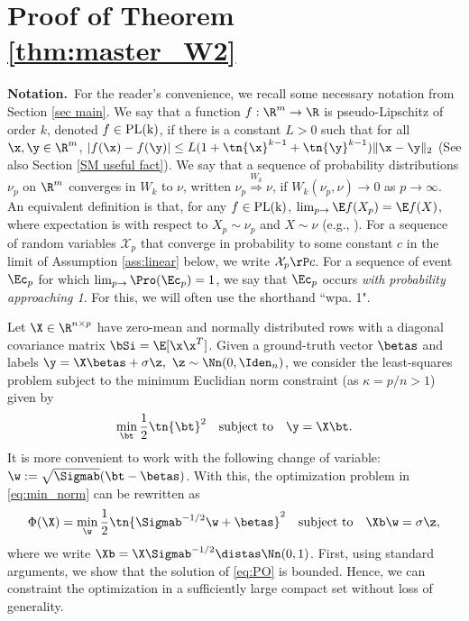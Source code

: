 
\section{Proof of Theorem \ref{thm:master_W2}}\label{sec proof thm 1}

\noindent\textbf{Notation.}~For the reader's convenience, we recall some necessary notation from Section \ref{sec main}.  We say that a function $f:\R^m\rightarrow\R$ is pseudo-Lipschitz of order $k$, denoted $f\in\rm{PL}(k)$, if there is a constant $L>0$ such that for all $\x,\y\in\R^m$,
$
|f(\x) - f(\y)|\leq L(1+\tn{\x}^{k-1}+\tn{\y}^{k-1})\|\x-\y\|_2 
$
(See also Section \ref{SM useful fact}). 
We say that a sequence of probability distributions $\nu_p$ on $\R^m$ {converges in $W_k$} to 
$\nu$, written $\nu_p\stackrel{W_k}{\Longrightarrow} \nu$, if $W_k(\nu_p,\nu) \rightarrow 0$ as $p \rightarrow \infty$. An equivalent definition is that, for any $f\in\rm{PL}(k)$, $\lim_{p\rightarrow}\E f(X_p)=\E f(X)$, where expectation is with respect to $X_p\sim\nu_p$ and $X\sim\nu$ (e.g., \cite{montanari2017estimation}).
%
For a sequence of random variables $\mathcal{X}_{p}$ that converge in probability to some constant $c$ in the limit of Assumption \ref{ass:linear} below, we  write $\mathcal{X}_{p}\rP c$. For a sequence of event $\Ec_p$ for which $\lim_{p\rightarrow}\Pro(\Ec_p) = 1$, we say that $\Ec_p$ occurs \emph{with probability approaching 1}. For this, we will often use the shorthand ``wpa. 1".


\vspace{5pt}
Let $\X\in\R^{n\times p}$ have zero-mean and normally distributed rows with a diagonal covariance matrix $\bSi=\E[\x\x^T]$. Given a ground-truth vector $\betas$ and labels $\y=\X\betas+\sigma \z,~\z\sim\Nn(0,\Iden_n)$, we consider the least-squares problem subject to the minimum Euclidian norm constraint (as $\kappa=p/n>1$) given by
\begin{align}\label{eq:PO_beta}
\min_{\bt}\frac{1}{2}\tn{\bt}^2\quad\text{subject to}\quad \y=\X\bt.
\end{align}
It is more convenient to work with the following change of variable: $\w:=\sqrt{\Sigmab}(\bt-\betas)$. With this, the optimization problem  in \eqref{eq:min_norm} can be rewritten as
\begin{align}\label{eq:PO}
\Phi(\X)=\min_{\w} \frac{1}{2}\tn{\Sigmab^{-1/2}\w+\betas}^2\quad\text{subject to}\quad \Xb\w=\sigma \z,
\end{align}
where we write $\Xb=\X\Sigmab^{-1/2}\distas\Nn(0,1)$. First, using standard arguments, we show that the solution of \eqref{eq:PO} is bounded. Hence, we can constraint the optimization in a sufficiently large compact set without loss of generality.

